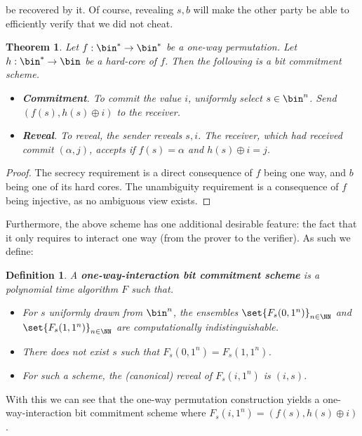 \documentclass{article}
\newtheorem{theorem}{Theorem}
\newtheorem{definition}{Definition}
\begin{document}
be recovered by it. Of course, revealing $s, b$ will make the other party be able to efficiently verify that we did not cheat.
\begin{theorem}
    Let $f: \bin^* \to \bin^*$ be a one-way permutation. Let $h: \bin^* \to \bin$ be a hard-core of $f$. Then the following is a bit commitment scheme.
    \begin{itemize}
        \item \textbf{Commitment}. To commit the value $i$, uniformly select $s \in \bin^n$. Send $(f(s), h(s) \oplus i)$ to the receiver.
        \item \textbf{Reveal}. To reveal, the sender reveals $s, i$. The receiver, which had received commit $(\alpha, j)$, accepts if $f(s) = \alpha$ and $h(s) \oplus i = j$.
    \end{itemize}
\end{theorem}
\begin{proof}
    The secrecy requirement is a direct consequence of $f$ being one way, and $b$ being one of its hard cores.
    The unambiguity requirement is a consequence of $f$ being injective, as no ambiguous view exists.
\end{proof}

Furthermore, the above scheme has one additional desirable feature: the fact that it only requires to interact one way (from the prover to the verifier).
As such we define:
\begin{definition}
    A \textbf{one-way-interaction bit commitment scheme} is a polynomial time algorithm $F$ such that.
    \begin{itemize}
        \item For $s$ uniformly drawn from $\bin^n$, the ensembles $\set{ F_s(0, 1^n) }_{n \in \NN}$ and $\set{ F_s(1, 1^n) }_{n \in \NN}$ are computationally indistinguishable.
        \item There does not exist $s$ such that $F_s(0, 1^n) = F_s(1, 1^n)$.
        \item For such a scheme, the (canonical) reveal of $F_s(i, 1^n)$ is $(i, s)$.
    \end{itemize}
\end{definition}
With this we can see that the one-way permutation construction yields a one-way-interaction bit commitment scheme where $F_s(i, 1^n) = (f(s), h(s) \oplus i)$.
\end{document}
